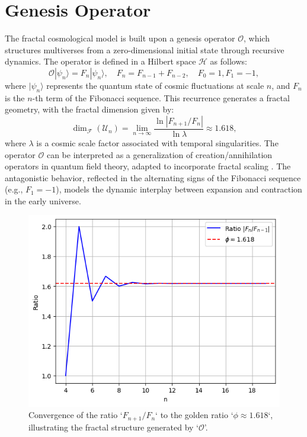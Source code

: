 \documentclass[aps,prl,twocolumn,groupedaddress]{revtex4-2}
\begin{document}
\section{Genesis Operator}
The fractal cosmological model is built upon a genesis operator \(\mathcal{O}\), which structures multiverses from a zero-dimensional initial state through recursive dynamics. The operator is defined in a Hilbert space \(\mathcal{H}\) as follows:
\begin{equation}
\mathcal{O} |\psi_n\rangle = F_n |\psi_n\rangle, \quad F_n = F_{n-1} + F_{n-2}, \quad F_0 = 1, F_1 = -1,
\end{equation}
where \(|\psi_n\rangle\) represents the quantum state of cosmic fluctuations at scale \(n\), and \(F_n\) is the \(n\)-th term of the Fibonacci sequence. This recurrence generates a fractal geometry, with the fractal dimension given by:
\begin{equation}
\dim_{\mathscr{F}}(\mathcal{U}_n) = \lim_{n \to \infty} \frac{\ln |F_{n+1}/F_n|}{\ln \lambda} \approx 1.618,
\end{equation}
where \(\lambda\) is a cosmic scale factor associated with temporal singularities. The operator \(\mathcal{O}\) can be interpreted as a generalization of creation/annihilation operators in quantum field theory, adapted to incorporate fractal scaling \cite{Nottale1993}. The antagonistic behavior, reflected in the alternating signs of the Fibonacci sequence (e.g., \(F_1 = -1\)), models the dynamic interplay between expansion and contraction in the early universe.

\begin{figure}
    \centering
    \includegraphics[width=\columnwidth]{figures/fibonacci_ratio.png}
    \caption{Convergence of the ratio `\(F_{n+1}/F_n\)` to the golden ratio `\(\phi \approx 1.618\)`, illustrating the fractal structure generated by `\(\mathcal{O}\)'.}
    \label{fig:fibonacci_ratio}
\end{figure}
\end{document}

